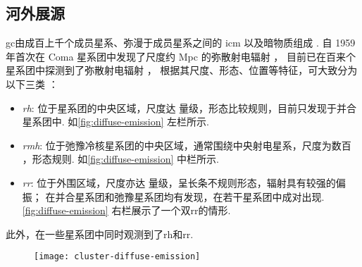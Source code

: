 \subsection{河外展源}
\label{sec:eg-extended}

\ac{gc}由成百上千个成员星系、弥漫于成员星系之间的 \ac{icm} 以及暗物质组成
\cite{sarazin1986,bohringer2010}.
自 1959 年首次在 Coma 星系团中发现了尺度约 \si{Mpc} 的弥散射电辐射 \cite{large1959}，
目前已在百来个星系团中探测到了弥散射电辐射 \cite{feretti2012,vanWeeren2019}，
根据其尺度、形态、位置等特征，可大致分为以下三类
\cite{feretti2012,kale2016}：
\begin{itemize}
  \item \emph{\acf{rh}}:
    位于星系团的中央区域，尺度达 \si{\Mpc} 量级，形态比较规则，目前只发现于并合星系团中.
    如\autoref{fig:diffuse-emission} 左栏所示.
  \item \emph{\acf{rmh}}:
    位于弛豫冷核星系团的中央区域，通常围绕中央射电星系，尺度为数百 \si{\kpc}，形态规则.
    如\autoref{fig:diffuse-emission} 中栏所示.
  \item \emph{\acf{rr}}:
    位于外围区域，尺度亦达 \si{\Mpc} 量级，呈长条不规则形态，辐射具有较强的偏振；
    在并合星系团和弛豫星系团均有发现，在若干星系团中成对出现.
    \autoref{fig:diffuse-emission} 右栏展示了一个双\ac{rr}的情形.
\end{itemize}
此外，在一些星系团中同时观测到了\ac{rh}和\ac{rr}.

\begin{figure}[htp]
  \centering
  \texttt{[image: cluster-diffuse-emission]}
  \label{fig:diffuse-emission}
\end{figure}

